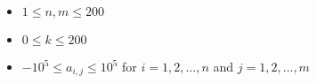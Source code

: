 \begin{itemize}
\tightlist
\item $1 \leq n, m \leq 200$
\item $0 \leq k \leq 200$
\item $-10^5 \leq a_{i, j} \leq 10^5$ for $i = 1, 2, \ldots, n$ and $j = 1, 2, \ldots, m$
\end{itemize}
